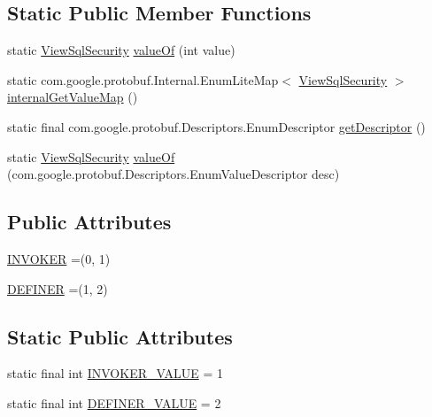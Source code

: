\subsection*{Static Public Member Functions}
\begin{DoxyCompactItemize}
\item 
static \mbox{\hyperlink{enumcom_1_1mysql_1_1cj_1_1x_1_1protobuf_1_1_mysqlx_crud_1_1_view_sql_security}{View\+Sql\+Security}} \mbox{\hyperlink{enumcom_1_1mysql_1_1cj_1_1x_1_1protobuf_1_1_mysqlx_crud_1_1_view_sql_security_a41f05899b6d990443586fa60d68b3cf7}{value\+Of}} (int value)
\item 
static com.\+google.\+protobuf.\+Internal.\+Enum\+Lite\+Map$<$ \mbox{\hyperlink{enumcom_1_1mysql_1_1cj_1_1x_1_1protobuf_1_1_mysqlx_crud_1_1_view_sql_security}{View\+Sql\+Security}} $>$ \mbox{\hyperlink{enumcom_1_1mysql_1_1cj_1_1x_1_1protobuf_1_1_mysqlx_crud_1_1_view_sql_security_a36cdc91062a8a22f18f3e4fad0439e6e}{internal\+Get\+Value\+Map}} ()
\item 
static final com.\+google.\+protobuf.\+Descriptors.\+Enum\+Descriptor \mbox{\hyperlink{enumcom_1_1mysql_1_1cj_1_1x_1_1protobuf_1_1_mysqlx_crud_1_1_view_sql_security_a411306c342142fed4a61dcd4e6a72acb}{get\+Descriptor}} ()
\item 
static \mbox{\hyperlink{enumcom_1_1mysql_1_1cj_1_1x_1_1protobuf_1_1_mysqlx_crud_1_1_view_sql_security}{View\+Sql\+Security}} \mbox{\hyperlink{enumcom_1_1mysql_1_1cj_1_1x_1_1protobuf_1_1_mysqlx_crud_1_1_view_sql_security_a38c65d98fdac69daab036dc8a0202dc8}{value\+Of}} (com.\+google.\+protobuf.\+Descriptors.\+Enum\+Value\+Descriptor desc)
\end{DoxyCompactItemize}
\subsection*{Public Attributes}
\begin{DoxyCompactItemize}
\item 
\mbox{\hyperlink{enumcom_1_1mysql_1_1cj_1_1x_1_1protobuf_1_1_mysqlx_crud_1_1_view_sql_security_a93a91bf633f0b17b1a2b4a1daa17fe7d}{I\+N\+V\+O\+K\+ER}} =(0, 1)
\item 
\mbox{\hyperlink{enumcom_1_1mysql_1_1cj_1_1x_1_1protobuf_1_1_mysqlx_crud_1_1_view_sql_security_aec1137dbb0a2be64956f2b0552a9686e}{D\+E\+F\+I\+N\+ER}} =(1, 2)
\end{DoxyCompactItemize}
\subsection*{Static Public Attributes}
\begin{DoxyCompactItemize}
\item 
static final int \mbox{\hyperlink{enumcom_1_1mysql_1_1cj_1_1x_1_1protobuf_1_1_mysqlx_crud_1_1_view_sql_security_ad7ec3c31af486f6a2afd25489e56a120}{I\+N\+V\+O\+K\+E\+R\+\_\+\+V\+A\+L\+UE}} = 1
\item 
static final int \mbox{\hyperlink{enumcom_1_1mysql_1_1cj_1_1x_1_1protobuf_1_1_mysqlx_crud_1_1_view_sql_security_a7133a5cc79c403d9870dd1d739f3f89d}{D\+E\+F\+I\+N\+E\+R\+\_\+\+V\+A\+L\+UE}} = 2
\end{DoxyCompactItemize}


